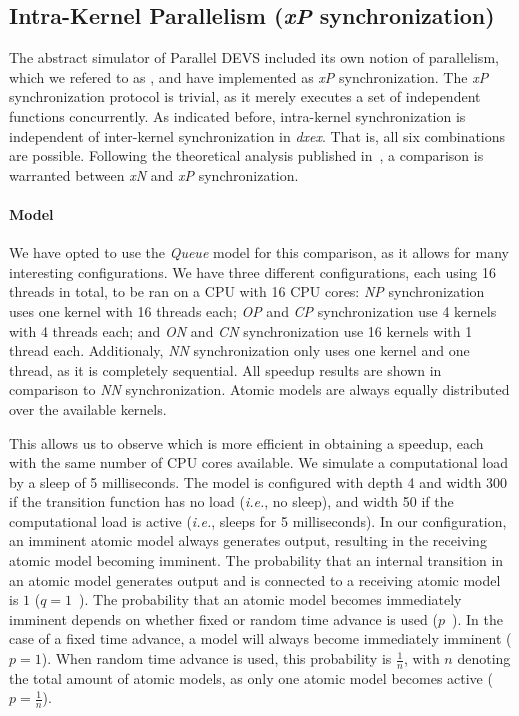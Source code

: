 \subsection{Intra-Kernel Parallelism (\textit{xP} synchronization)}
The abstract simulator of \textsf{Parallel DEVS} included its own notion of parallelism, which we refered to as \pSim, and have implemented as \textit{xP} synchronization.
The \textit{xP} synchronization protocol is trivial, as it merely executes a set of independent functions concurrently.
As indicated before, intra-kernel synchronization is independent of inter-kernel synchronization in \textit{dxex}.
That is, all six combinations are possible.
Following the theoretical analysis published in~\cite{amdahlpdevs}, a comparison is warranted between \textit{xN} and \textit{xP} synchronization.

\paragraph{Model}
We have opted to use the \textit{Queue} model for this comparison, as it allows for many interesting configurations.
We have three different configurations, each using 16 threads in total, to be ran on a CPU with 16 CPU cores:
\textit{NP} synchronization uses one kernel with 16 threads each;
\textit{OP} and \textit{CP} synchronization use 4 kernels with 4 threads each; and
\textit{ON} and \textit{CN} synchronization use 16 kernels with 1 thread each.
Additionaly, \textit{NN} synchronization only uses one kernel and one thread, as it is completely sequential.
All speedup results are shown in comparison to \textit{NN} synchronization.
Atomic models are always equally distributed over the available kernels.

This allows us to observe which is more efficient in obtaining a speedup, each with the same number of CPU cores available.
We simulate a computational load by a sleep of 5 milliseconds.
The model is configured with depth 4 and width 300 if the transition function has no load (\textit{i.e.}, no sleep), and width 50 if the computational load is active (\textit{i.e.}, sleeps for 5 milliseconds).
In our configuration, an imminent atomic model always generates output, resulting in the receiving atomic model becoming imminent.
The probability that an internal transition in an atomic model generates output and is connected to a receiving atomic model is $1$ ($q = 1$~\cite{amdahlpdevs}).
The probability that an atomic model becomes immediately imminent depends on whether fixed or random time advance is used ($p$~\cite{amdahlpdevs}).
In the case of a fixed time advance, a model will always become immediately imminent ($p = 1$).
When random time advance is used, this probability is $\frac{1}{n}$, with $n$ denoting the total amount of atomic models, as only one atomic model becomes active ($p = \frac{1}{n}$).

